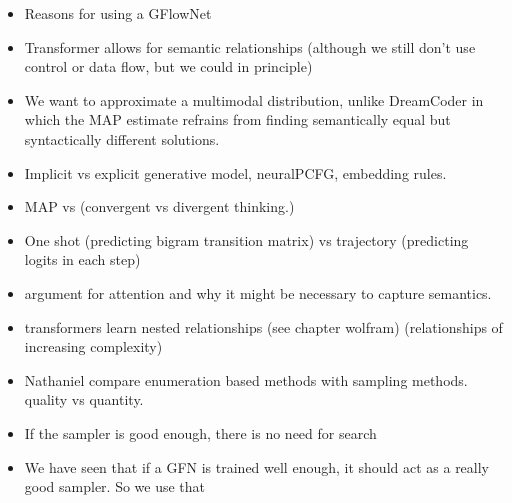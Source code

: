 \begin{itemize}
    \item Reasons for using a GFlowNet 
    \item Transformer allows for semantic relationships (although we still don't use control or data flow, but we could in principle)
    \item We want to approximate a multimodal distribution, unlike DreamCoder in which the MAP estimate refrains from finding semantically equal but syntactically different solutions.
    \item Implicit vs explicit generative model, neuralPCFG, embedding rules. 
    \item MAP vs  (convergent vs divergent thinking.)
    \item One shot (predicting bigram transition matrix) vs trajectory (predicting logits in each step)
    \item argument for attention and why it might be necessary to capture semantics.
    \item transformers learn nested relationships (see chapter wolfram) (relationships of increasing complexity)
\end{itemize}
    








\begin{itemize}
    \item Nathaniel compare enumeration based methods with sampling methods. quality vs quantity.
    \item If the sampler is good enough, there is no need for search
    \item We have seen that if a GFN is trained well enough, it should act as a really good sampler. So we use that 
\end{itemize}


